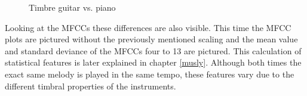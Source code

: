 \begin{figure}[htbp]
	\centering
	\caption{Timbre guitar vs. piano}	
	\label{fig:timbre}
\end{figure}
\FloatBarrier
Looking at the MFCCs these differences are also visible.
This time the MFCC plots are pictured without the previously mentioned scaling and the mean value and standard deviance of the MFCCs four to 13 are pictured. This calculation of statistical features is later explained in chapter \ref{musly}. Although both times the exact same melody is played in the same tempo, these features vary due to the different timbral properties of the instruments. 
